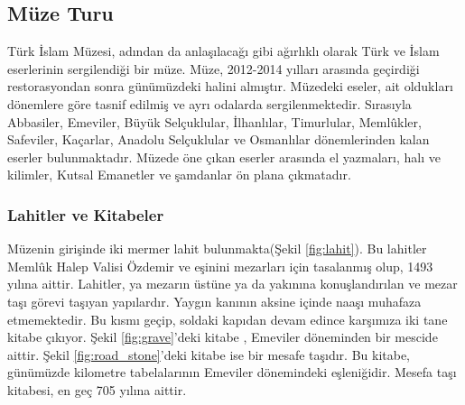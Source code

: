 \subsection{Müze Turu}
\indent\indent Türk İslam Müzesi, adından da anlaşılacağı gibi ağırlıklı olarak Türk ve İslam eserlerinin sergilendiği bir müze. Müze, 2012-2014 yılları arasında geçirdiği restorasyondan sonra günümüzdeki halini almıştır. Müzedeki eseler, ait oldukları dönemlere göre tasnif edilmiş ve ayrı odalarda sergilenmektedir. Sırasıyla Abbasiler, Emeviler, Büyük Selçuklular, İlhanlılar, Timurlular, Memlûkler, Safeviler, Kaçarlar, Anadolu Selçuklular ve Osmanlılar dönemlerinden kalan eserler bulunmaktadır. Müzede öne çıkan eserler arasında el yazmaları, halı ve kilimler, Kutsal Emanetler ve şamdanlar ön plana çıkmatadır.
\subsubsection{Lahitler ve Kitabeler}
\indent\indent Müzenin girişinde iki mermer lahit bulunmakta(Şekil \ref{fig:lahit}). Bu lahitler Memlûk Halep Valisi Özdemir ve eşinini mezarları için tasalanmış olup, 1493 yılına aittir. Lahitler, ya mezarın üstüne ya da yakınına konuşlandırılan ve mezar taşı görevi taşıyan yapılardır. Yaygın kanının aksine içinde naaşı muhafaza etmemektedir.\newline
\indent Bu kısmı geçip, soldaki kapıdan devam edince karşımıza iki tane kitabe çıkıyor. Şekil \ref{fig:grave}'deki kitabe , Emeviler döneminden bir mescide aittir. Şekil \ref{fig:road_stone}'deki kitabe  ise bir mesafe taşıdır. Bu kitabe, günümüzde kilometre tabelalarının Emeviler dönemindeki eşleniğidir. Mesefa taşı kitabesi, en geç 705 yılına aittir.\newline
